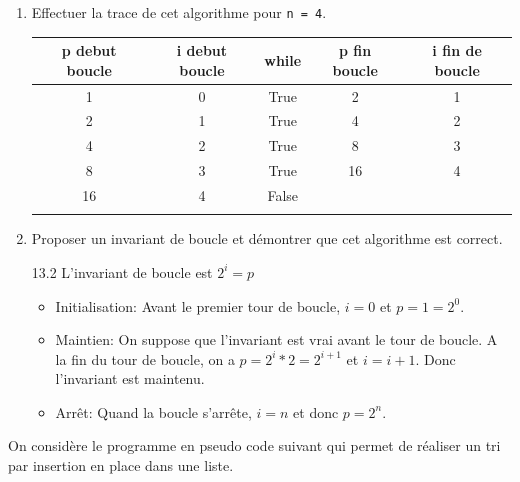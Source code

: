 \documentclass[a4paper,10pt]{report}
\def\ptsexoD{5}
\begin{document}
\begin{enumerate}

    \item Effectuer la trace de cet algorithme pour \verb|n = 4|.
    
    \medskip

    \begin{tabular}{|c|c|c|c|c|}
        \hline
        p debut boucle& i debut boucle & while &p fin boucle & i fin de boucle\\ \hline
        1&0&True&2&1\\\hline
        2&1&True&4&2\\\hline
        4&2&True&8&3\\\hline
        8&3&True&16&4\\\hline
        16&4&False&&\\\hline
        &&&&\\\hline


    \end{tabular}



    
    
    \item Proposer un invariant de boucle et démontrer que cet algorithme est correct.

    \begin{answer}{1}{3.2}  L'invariant de boucle est $2^i = p$
  
        \medskip

        \begin{itemize}
            \item Initialisation: Avant le premier tour de boucle, $i = 0$ et $p = 1 = 2^0$.
            \item Maintien: On suppose que l'invariant est vrai avant le tour de boucle. A la fin du tour de boucle, on a $p = 2^i * 2 = 2^{i+1}$ et $i = i + 1$. Donc l'invariant est maintenu.
            \item Arrêt: Quand la boucle s'arrête, $i = n$ et donc $p = 2^n$.
        \end{itemize}
    
    
    \end{answer}

\end{enumerate}

\newpage

\thispagestyle{DS_LP}          %

\exods{\ptsexoD}


On considère le programme en pseudo code suivant qui permet de réaliser un tri par insertion en place dans une liste.
\end{document}
